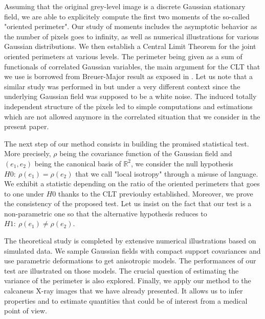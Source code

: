 \documentclass[12pt]{article}
\theoremstyle{Theorem}
\theoremstyle{definition}
\begin{document}
Assuming that the original grey-level image is a discrete Gaussian stationary field, we are able to explicitely compute the first two moments of the so-called "oriented perimeter". Our study of moments includes the asymptotic behavior as the number of pixels goes to infinity, as well as numerical illustrations for various Gaussian distributions. We then establish a Central Limit Theorem for the joint oriented perimeters at various levels. The perimeter being given as a sum of functionals of correlated Gaussian variables, the main argument for the CLT that we use is borrowed from Breuer-Major result as exposed in \cite{Arcones}. Let us note that a similar study was performed in \cite{Psymetrie} but under a very different context since the underlying Gaussian field was supposed to be a white noise. The induced totally independent structure of the pixels led to simple computations and estimations which are not allowed anymore in the correlated situation that we consider in the present paper. 

The next step of our method consists in building the promised statistical test. More precisely, $\rho$ being the covariance function of the Gaussian field and $(e_1,e_2)$ being the canonical basis of $\mathbb R^2$, we consider the null hypothesis $H0:~\rho(e_1)=\rho(e_2)$ that we call "local isotropy" through a misuse of language. We exhibit a statistic depending on the ratio of the oriented perimeters that goes to one under $H0$ thanks to the CLT previoulsy established. Moreover, we prove the consistency of the proposed test. Let us insist on the fact that our test is a non-parametric one so that the alternative hypothesis reduces to $H1:~\rho(e_1)\ne \rho(e_2)$. 

The theoretical study is completed by extensive numerical illustrations based on simulated data. We sample Gaussian fields with compact support covariances and use parametric deformations to get anisotropic models. The performances of our test are illustrated on those models. The crucial question of estimating the variance of the perimeter is also explored. Finally, we apply our method to the calcaneus X-ray images that we have already presented. It allows us to infer properties and to estimate quantities that could be of interest from a medical point of view. 

\bigskip
\end{document}

